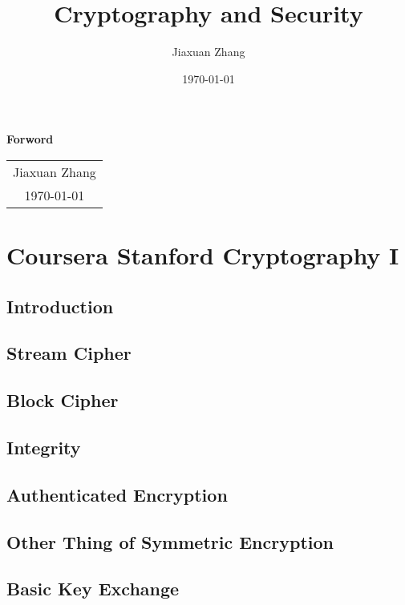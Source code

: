 \documentclass[11pt, a4paper, oneside]{book}
\title{{\Huge{\textbf{Cryptography and Security}}}\\}
\author{Jiaxuan Zhang}
\date{\today}
\begin{document}
\maketitle
{}
\setcounter{page}{1}

\begin{center}
    \Huge\textbf{Forword}
\end{center}

\begin{flushright}
    \begin{tabular}{c}
        Jiaxuan Zhang\\
        \today
    \end{tabular}
\end{flushright}

\newpage
{}
\setcounter{page}{1}
\tableofcontents
\newpage
\setcounter{page}{1}


\part{Coursera Stanford Cryptography I}

\chapter{Introduction}


\chapter{Stream Cipher}


\chapter{Block Cipher}


\chapter{Integrity}


\chapter{Authenticated Encryption}


\chapter{Other Thing of Symmetric Encryption}


\chapter{Basic Key Exchange}

\end{document}
